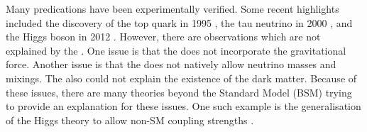 Many \SM predications have been experimentally verified. Some recent highlights included the discovery of the top quark in 1995 \cite{Abachi:1995iq}, the tau neutrino in 2000 \cite{Kodama:2000mp}, and the Higgs boson in 2012 \cite{Aad:2012tfa,Chatrchyan:2012ufa}. However, there are observations which are not explained by the \SM. One issue is that the \SM does not incorporate the gravitational force. Another issue is that the \SM does not natively allow neutrino masses and mixings. The \SM also could not explain the existence of the dark matter. Because of these issues, there are many theories beyond the Standard Model (BSM) trying to provide an explanation for these issues. One such example is the generalisation of the Higgs theory to allow non-SM coupling strengths \cite{Kaplan:1983fs,Goldberger:2008zz}.


